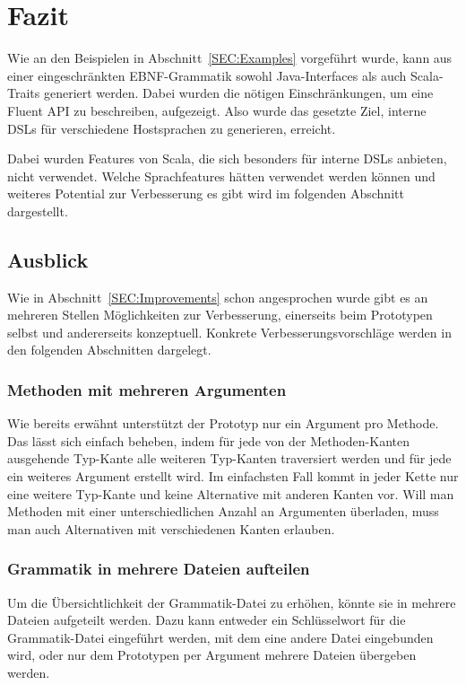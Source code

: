 \documentclass[../InterneDSLs.tex]{subfiles}
\begin{document}
\chapter{Fazit}
Wie an den Beispielen in Abschnitt~\ref{SEC:Examples} vorgeführt wurde, kann aus einer eingeschränkten EBNF-Grammatik sowohl Java-Interfaces als auch Scala-Traits generiert werden. Dabei wurden die nötigen Einschränkungen, um eine Fluent API zu beschreiben, aufgezeigt. Also wurde das gesetzte Ziel, interne DSLs für verschiedene Hostsprachen zu generieren, erreicht.

Dabei wurden Features von Scala, die sich besonders für interne DSLs anbieten, nicht verwendet. Welche Sprachfeatures hätten verwendet werden können und weiteres Potential zur Verbesserung es gibt wird im folgenden Abschnitt dargestellt.

\section{Ausblick}
Wie in Abschnitt~\ref{SEC:Improvements} schon angesprochen wurde gibt es an mehreren Stellen Möglichkeiten zur Verbesserung, einerseits beim Prototypen selbst und andererseits konzeptuell. Konkrete Verbesserungsvorschläge werden in den folgenden Abschnitten dargelegt.

\subsection{Methoden mit mehreren Argumenten}
Wie bereits erwähnt unterstützt der Prototyp nur ein Argument pro Methode. Das lässt sich einfach beheben, indem für jede von der Methoden-Kanten ausgehende Typ-Kante alle weiteren Typ-Kanten traversiert werden und für jede ein weiteres Argument erstellt wird. Im einfachsten Fall kommt in jeder Kette nur eine weitere Typ-Kante und keine Alternative mit anderen Kanten vor. Will man Methoden mit einer unterschiedlichen Anzahl an Argumenten überladen, muss man auch Alternativen mit verschiedenen Kanten erlauben.

\subsection{Grammatik in mehrere Dateien aufteilen}
Um die Übersichtlichkeit der Grammatik-Datei zu erhöhen, könnte sie in mehrere Dateien aufgeteilt werden. Dazu kann entweder ein Schlüsselwort für die Grammatik-Datei eingeführt werden, mit dem eine andere Datei eingebunden wird, oder nur dem Prototypen per Argument mehrere Dateien übergeben werden.
\end{document}
